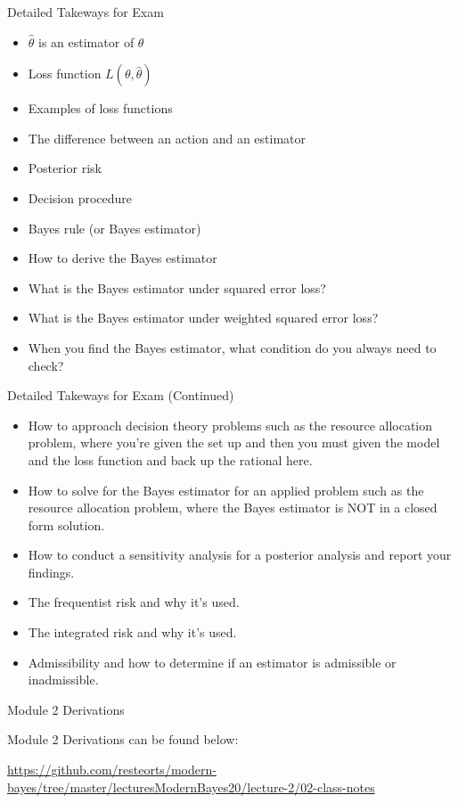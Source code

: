\documentclass[
  ignorenonframetext,
]{beamer}
\providecommand{\tightlist}{%
  \setlength{\itemsep}{0pt}\setlength{\parskip}{0pt}}
\begin{document}
\begin{frame}{Detailed Takeways for Exam}
\protect\hypertarget{detailed-takeways-for-exam}{}

\begin{itemize}
\tightlist
\item
  \(\hat{\theta}\) is an estimator of \(\theta\)
\item
  Loss function \(L(\theta, \hat{\theta})\)
\item
  Examples of loss functions
\item
  The difference between an action and an estimator
\item
  Posterior risk
\item
  Decision procedure
\item
  Bayes rule (or Bayes estimator)
\item
  How to derive the Bayes estimator
\item
  What is the Bayes estimator under squared error loss?
\item
  What is the Bayes estimator under weighted squared error loss?
\item
  When you find the Bayes estimator, what condition do you always need
  to check?
\end{itemize}

\end{frame}

\begin{frame}{Detailed Takeways for Exam (Continued)}
\protect\hypertarget{detailed-takeways-for-exam-continued}{}

\begin{itemize}
\tightlist
\item
  How to approach decision theory problems such as the resource
  allocation problem, where you're given the set up and then you must
  given the model and the loss function and back up the rational here.
\item
  How to solve for the Bayes estimator for an applied problem such as
  the resource allocation problem, where the Bayes estimator is NOT in a
  closed form solution.
\item
  How to conduct a sensitivity analysis for a posterior analysis and
  report your findings.
\item
  The frequentist risk and why it's used.
\item
  The integrated risk and why it's used.
\item
  Admissibility and how to determine if an estimator is admissible or
  inadmissible.
\end{itemize}

\end{frame}

\begin{frame}{Module 2 Derivations}
\protect\hypertarget{module-2-derivations}{}

Module 2 Derivations can be found below:

\url{https://github.com/resteorts/modern-bayes/tree/master/lecturesModernBayes20/lecture-2/02-class-notes}

\end{frame}
\end{document}
